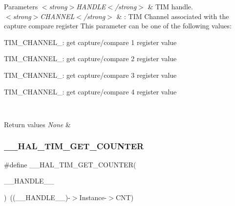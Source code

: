 \begin{DoxyParams}{Parameters}
{\em $<$strong$>$\+H\+A\+N\+D\+L\+E$<$/strong$>$} & T\+IM handle. \\
\hline
{\em $<$strong$>$\+C\+H\+A\+N\+N\+E\+L$<$/strong$>$} & \+: T\+IM Channel associated with the capture compare register This parameter can be one of the following values\+: \begin{DoxyItemize}
\item T\+I\+M\+\_\+\+C\+H\+A\+N\+N\+E\+L\+\_\+: get capture/compare 1 register value \item T\+I\+M\+\_\+\+C\+H\+A\+N\+N\+E\+L\+\_\+: get capture/compare 2 register value \item T\+I\+M\+\_\+\+C\+H\+A\+N\+N\+E\+L\+\_\+: get capture/compare 3 register value \item T\+I\+M\+\_\+\+C\+H\+A\+N\+N\+E\+L\+\_\+: get capture/compare 4 register value \end{DoxyItemize}
\\
\hline
\end{DoxyParams}

\begin{DoxyRetVals}{Return values}
{\em None} & \\
\hline
\end{DoxyRetVals}
\mbox{\label{group___t_i_m___exported___macros_gaf1af08014b9d06efbbb091d58d47c8ba}} 
\subsubsection{\texorpdfstring{\+\_\+\+\_\+\+H\+A\+L\+\_\+\+T\+I\+M\+\_\+\+G\+E\+T\+\_\+\+C\+O\+U\+N\+T\+ER}{\_\_HAL\_TIM\_GET\_COUNTER}}
{\footnotesize\ttfamily \#define \+\_\+\+\_\+\+H\+A\+L\+\_\+\+T\+I\+M\+\_\+\+G\+E\+T\+\_\+\+C\+O\+U\+N\+T\+ER(\begin{DoxyParamCaption}\item[{}]{\+\_\+\+\_\+\+H\+A\+N\+D\+L\+E\+\_\+\+\_\+ }\end{DoxyParamCaption})~((\+\_\+\+\_\+\+H\+A\+N\+D\+L\+E\+\_\+\+\_\+)-\/$>$Instance-\/$>$C\+NT)}



